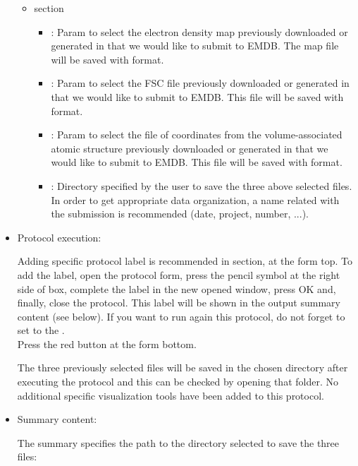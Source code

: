 \begin{itemize}
    \begin{itemize}
     \item {} section

    \begin{itemize}
     \item {}: Param to select the electron density map previously downloaded or generated in \scipion that we would like to submit to EMDB. The map file will be saved with  format.
     \item {}: Param to select the FSC file previously downloaded or generated in \scipion that we would like to submit to EMDB. This file will be saved with  format.
     \item {}: Param to select the file of coordinates from the volume-associated atomic structure previously downloaded or generated in \scipion that we would like to submit to EMDB. This file will be saved with  format.
     \item {}: Directory specified by the user to save the three above selected files. In order to get appropriate data organization, a name related with the submission is recommended (date, project, number, ...).
    \end{itemize}
   \end{itemize}

  \item Protocol execution:
  
  Adding specific protocol label is recommended in  section, at the form top. To add the label, open the protocol form, press the pencil symbol at the right side of  box, complete the label in the new opened window, press OK and, finally, close the protocol. This label will be shown in the output summary content (see below). If you want to run again this protocol, do not forget to set to  the .\\
  Press the  red button at the form bottom.
  
  The three previously selected files will be saved in the chosen directory after executing the protocol and this can be checked by opening that folder. No additional specific visualization tools have been added to this protocol.

  \item Summary content:
  
   The summary specifies the path to the directory selected to save the three files:\\
    
\end{itemize}




